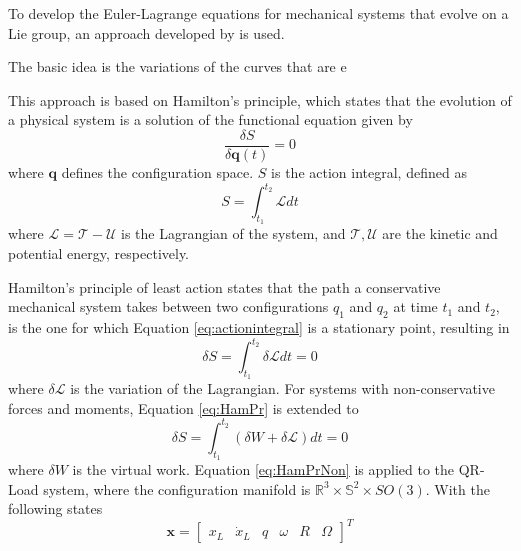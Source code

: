 To develop the Euler-Lagrange equations for mechanical systems that evolve on a Lie group, an approach developed by \cite{Lee2008,Lee2005,Lee2009,Lee2011} is used. 

The basic idea is the variations of the curves that are e	

This approach is based on Hamilton's principle, which states that the evolution of a physical system is a solution of the functional equation given by
\begin{equation}\label{key}
\frac{\delta S}{\delta \mathbf{q}(t)}=0
\end{equation}
where $ \mathbf{q} $ defines the configuration space. $ S $ is the action integral, defined as
\begin{equation}\label{eq:actionintegral}
S=\int_{t_1}^{t_2}\mathcal{L}dt
\end{equation}
where $\mathcal{L}=\mathcal{T}-\mathcal{U} $ is the Lagrangian of the system, and $\mathcal{T},\mathcal{U}$ are the kinetic and potential energy, respectively. 


Hamilton's principle of least action states that the path a conservative mechanical system takes between two configurations $ q_1 $ and $ q_2 $ at time $ t_1 $ and $ t_2 $, is the one for which Equation \ref{eq:actionintegral} is a stationary point, resulting in
\begin{equation}\label{eq:HamPr}
\delta S=\int_{t_1}^{t_2}\delta\mathcal{L}dt=0
\end{equation}
where $ \delta\mathcal{L} $ is the variation of the Lagrangian. For systems with non-conservative forces and moments, Equation \ref{eq:HamPr} is extended to
\begin{equation}\label{eq:HamPrNon}
\delta S=\int_{t_1}^{t_2}(\delta W+\delta\mathcal{L})dt=0
\end{equation}
where $ \delta W $ is the virtual work. Equation \ref{eq:HamPrNon} is applied to the QR-Load system, where the configuration manifold is $ \mathbb{R}^3\times \mathbb{S}^2\times SO(3) $. With the following states
\begin{equation}\label{eq:mod.S}
\textbf{x}= \begin{bmatrix}x_L& \dot{x}_L& q& \omega&R&\Omega
\end{bmatrix}^T
\end{equation}


